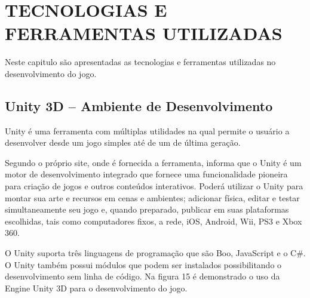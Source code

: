 \chapter{TECNOLOGIAS E FERRAMENTAS UTILIZADAS}
\label{cap:TECNOLOGIAS-E-FERRAMENTAS-UTILIZADAS}

Neste capitulo são apresentadas as tecnologias e ferramentas utilizadas no desenvolvimento do jogo.

\section{Unity 3D – Ambiente de Desenvolvimento}
\label{sec:Unity-3D---Ambiente-de-Desenvolvimento}

Unity é uma ferramenta com múltiplas utilidades na qual permite o usuário a desenvolver desde um jogo simples até de um de última geração.

Segundo o próprio site, onde é fornecida a ferramenta, informa que o Unity é um motor de desenvolvimento integrado que fornece uma funcionalidade pioneira para criação de jogos e outros conteúdos interativos. Poderá utilizar o Unity para montar sua arte e recursos em cenas e ambientes; adicionar física, editar e testar simultaneamente seu jogo e, quando preparado, publicar em suas plataformas escolhidas, tais como computadores fixos, a rede, iOS, Android, Wii, PS3 e Xbox 360. 

O Unity suporta três linguagens de programação que são Boo, JavaScript e o C\#. O Unity também possui módulos que podem ser instalados possibilitando o desenvolvimento sem linha de código. \cite{unt}
Na figura 15 é demonstrado o uso da Engine Unity 3D para o desenvolvimento do jogo. 



	\begin{figure}[h!]
		\centering
	\end{figure}
	
